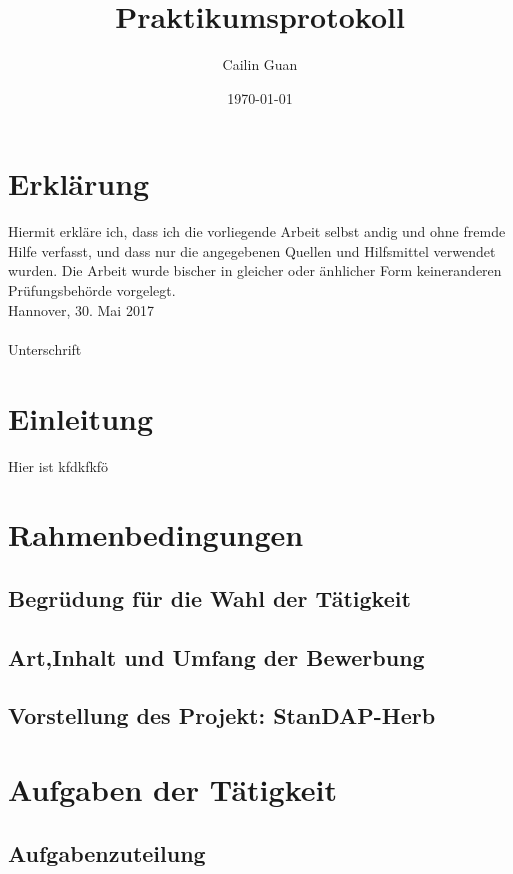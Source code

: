\documentclass[12pt,a4paper]{report}
\title{Praktikumsprotokoll}
\author{Cailin Guan}
\date{\today}
\begin{document}
\maketitle  
\chapter*{Erklärung}

Hiermit erkläre ich, dass ich die vorliegende Arbeit selbst andig und ohne fremde Hilfe verfasst, und dass nur die angegebenen Quellen und Hilfsmittel verwendet wurden. Die Arbeit wurde bischer in gleicher oder änhlicher Form keineranderen Prüfungsbehörde vorgelegt.\\

Hannover, 30. Mai 2017\\

\underline{\hspace{4.5cm}}\\
Unterschrift
\tableofcontents   
\chapter{Einleitung}
Hier ist kfdkfkfö

\chapter{Rahmenbedingungen}
\section{Begrüdung für die Wahl der Tätigkeit}

\section{Art,Inhalt und Umfang der Bewerbung}

\section{Vorstellung des Projekt: StanDAP-Herb}

\chapter{Aufgaben der Tätigkeit}
\section{Aufgabenzuteilung}
\end{document}

